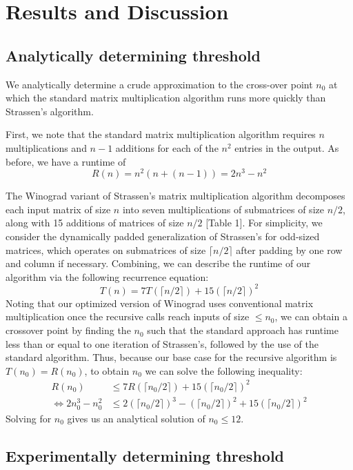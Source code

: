 \documentclass[a4paper]{article}
\begin{document}
\section{Results and Discussion}

\subsection{Analytically determining threshold}
We analytically determine a crude approximation to the cross-over point $n_0$ at which the standard matrix multiplication algorithm runs more quickly than Strassen's algorithm.

First, we note that the standard matrix multiplication algorithm requires $n$ multiplications and $n-1$ additions for each of the $n^2$ entries in the output. As before, we have a runtime of
$$R(n) = n^2(n + (n-1)) = 2n^3 - n^2$$

The Winograd variant of Strassen's matrix multiplication algorithm decomposes each input matrix of size $n$ into seven multiplications of submatrices of size $n/2$, along with 15 additions of matrices of size $n/2$ [Table 1]. For simplicity, we consider the dynamically padded generalization of Strassen's for odd-sized matrices, which operates on submatrices of size $\lceil n/2\rceil$ after padding by one row and column if necessary. Combining, we can describe the runtime of our algorithm via the following recurrence equation: 
$$T(n) = 7T(\lceil n/2\rceil) + 15(\lceil n/2\rceil)^2$$
Noting that our optimized version of Winograd uses conventional matrix multiplication once the recursive calls reach inputs of size $\leq n_0$, we can obtain a crossover point by finding the $n_0$ such that the standard approach has runtime less than or equal to one iteration of Strassen's, followed by the use of the standard algorithm. Thus, because our base case for the recursive algorithm is $T(n_0) = R(n_0)$, to obtain $n_0$ we can solve the following inequality:
\begin{align*}
R(n_0) &\leq 7R(\lceil n_0/2\rceil) + 15(\lceil n_0/2\rceil)^2 \\
\iff 2n_0^3-n_0^2 &\leq 2(\lceil n_0/2\rceil)^3 - (\lceil n_0/2\rceil)^2 + 15(\lceil n_0/2\rceil)^2
\end{align*}
Solving for $n_0$ gives us an analytical solution of $n_0 \leq 12$.


\subsection{Experimentally determining threshold}
\end{document}
